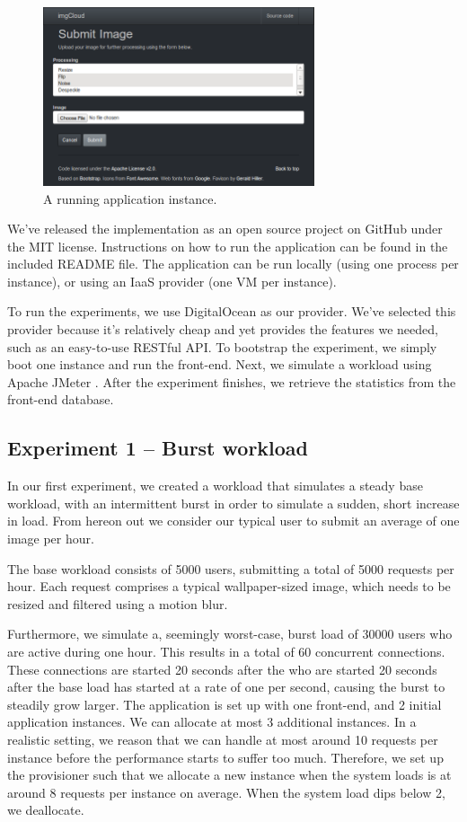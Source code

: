 \documentclass[conference]{IEEEtran}
\begin{document}
\begin{figure}
  \centering
    \includegraphics[width=80mm]{imgcloud-screenshot.png}
  \caption{A running application instance.}
\end{figure}

We've released the implementation as an open source project on GitHub \cite{imgcloud} under the MIT license. Instructions on how to run the application can be found in the included README file. The application can be run locally (using one process per instance), or using an IaaS provider (one VM per instance).

To run the experiments, we use DigitalOcean \cite{digital-ocean} as our provider. We've selected this provider because it's relatively cheap and yet provides the features we needed, such as an easy-to-use RESTful API. To bootstrap the experiment, we simply boot one instance and run the front-end. Next, we simulate a workload using Apache JMeter \cite{jmeter}. After the experiment finishes, we retrieve the statistics from the front-end database.


\subsection{Experiment 1 -- Burst workload}
In our first experiment, we created a workload that simulates a steady base workload, with an intermittent burst in order to simulate a sudden, short increase in load. From hereon out we consider our typical user to submit an average of one image per hour.

The base workload consists of 5000 users, submitting a total of 5000 requests per hour. Each request comprises a typical wallpaper-sized image, which needs to be resized and filtered using a motion blur. 

Furthermore, we simulate a, seemingly worst-case, burst load of 30000 users who are active during one hour. This results in a total of 60 concurrent connections. These connections are started 20 seconds after the who are started 20 seconds after the base load has started at a rate of one per second, causing the burst to steadily grow larger. 
The application is set up with one front-end, and 2 initial application instances. We can allocate at most 3 additional instances. In a realistic setting, we reason that we can handle at most around 10 requests per instance before the performance starts to suffer too much. Therefore, we set up the provisioner such that we allocate a new instance when the system loads is at around 8 requests per instance on average. When the system load dips below 2, we deallocate.
\end{document}
